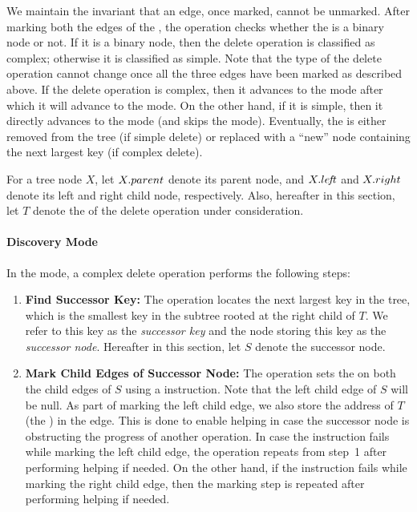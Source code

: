 \begin{limitscope}
We maintain the invariant that an edge, once marked, cannot be unmarked. After marking both the edges of the \targetnode{}, the operation checks whether the \targetnode{} is a binary node or not. If it is a binary node, then the delete operation is classified as complex; otherwise it is classified as simple. Note that the type of the delete operation cannot change once all the three edges have been marked as described above. If the delete operation is complex, then it advances to the \discovery{} mode after which it will advance to the \cleanup{} mode. On the other hand, if it is simple, then it directly advances to the \cleanup{} mode (and skips the \discovery{} mode). Eventually, the \targetnode{} is either removed from the tree (if simple delete) or replaced with a ``new'' node containing the next largest key (if complex delete). 

For a tree node $X$, let $X.parent$ denote its parent node, and $X.le\!f\!t$ and $X.right$ denote its left and right child node, respectively. Also, hereafter in this section, let $T$ denote the \targetnode{} of the delete operation under consideration.

\paragraph*{Discovery Mode}
In the \discovery{} mode, a complex delete operation  performs the following steps:
\begin{enumerate}[leftmargin=*, noitemsep]
\item \textbf{Find Successor Key:} The operation locates the next largest key in the tree, which is the smallest key in the subtree rooted at the right child of $T$. We refer to this key as the \emph{successor key} and the node storing this key as the \emph{successor node}. Hereafter in this section, let $S$ denote the successor node. 
\item \textbf{Mark Child Edges of Successor Node:} The operation sets the \promoteFlag{} on both the child edges of $S$ using a \CAS{} instruction. Note that the left child edge of $S$ will be null.  As part of marking the left child edge, we also store the address of $T$ (the \targetnode{}) in the edge. This is done to enable helping in case the successor node is obstructing the progress of another operation. 
In case the \CAS{} instruction fails while marking the left child edge, the operation repeats from step~1 after performing helping if needed. On the other hand, if the \CAS{} instruction fails while marking the right child edge, then the marking step is repeated after performing helping if needed. 


\end{enumerate}
\end{limitscope}
